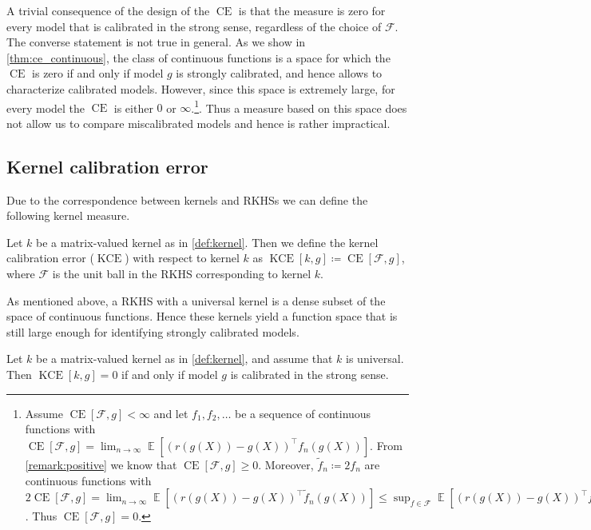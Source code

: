 \documentclass{article}
\DeclareMathOperator{\Expect}{\mathbb{E}}
\DeclareMathOperator{\measure}{CE}
\DeclareMathOperator{\kernelmeasure}{KCE}
\begin{document}
A trivial consequence of the design of the $\measure$ is that the measure is
zero for every model that is calibrated in the strong sense, regardless of the
choice of $\mathcal{F}$. The converse statement is not true in general. As we
show in \cref{thm:ce_continuous}, the class of continuous functions is a space
for which the $\measure$ is zero if and only if model $g$ is strongly
calibrated, and hence allows to characterize calibrated models. However, since
this space is extremely large, for every model the $\measure$ is either $0$ or
$\infty$.\footnote{Assume $\measure[\mathcal{F}, g] < \infty$ and let
  $f_1,f_2,\ldots$ be a sequence of continuous functions with
  $\measure[\mathcal{F}, g] = \lim_{n \to \infty} \Expect\left[{(r(g(X)) - g(X))}^\intercal f_n(g(X)) \right]$.
  From \cref{remark:positive} we know that $\measure[\mathcal{F}, g] \geq 0$.
  Moreover, $\tilde{f}_n \coloneqq 2f_n$ are continuous functions with
  $2\measure[\mathcal{F}, g] = \lim_{n \to \infty} \Expect\left[{(r(g(X)) - g(X))}^\intercal \tilde{f}_n(g(X)) \right] \leq \sup_{f \in \mathcal{F}} \Expect\left[{(r(g(X)) - g(X))}^\intercal f(g(X)) \right] = \measure[\mathcal{F}, g]$.
  Thus $\measure[\mathcal{F}, g] = 0$.}. Thus a measure based on this space
does not allow us to compare miscalibrated models and hence is rather
impractical.

\subsection{Kernel calibration error}

Due to the correspondence between kernels and RKHSs we can define the
following kernel measure.

\begin{definition}\label{def:kce}
  Let $k$ be a matrix-valued kernel as in \cref{def:kernel}. Then we define
  the kernel calibration error ($\kernelmeasure$) with respect to kernel $k$
  as $\kernelmeasure[k, g] \coloneqq \measure[\mathcal{F}, g]$, where
  $\mathcal{F}$ is the unit ball in the RKHS corresponding to kernel $k$.
\end{definition}

As mentioned above, a RKHS with a universal kernel is a dense subset of the
space of continuous functions. Hence these kernels yield a function space
that is still large enough for identifying strongly calibrated models.

\begin{theorem}
  Let $k$ be a matrix-valued kernel as in \cref{def:kernel}, and assume that $k$
  is universal. Then $\kernelmeasure[k, g] = 0$ if and only if model $g$
  is calibrated in the strong sense.
\end{theorem}
\end{document}
